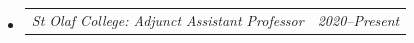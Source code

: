 \documentclass[12pt,letterpaper]{article}
\makeatletter
\newcommand{\headerpair}[2]{
    \begin{tabular*}{\linewidth}{l@{ \extracolsep{\fill} }r} {\large\emph{#1}} & {\large\emph{#2}}
    \end{tabular*}
}
\newcommand{\headerrow}[3]{\headerpair{#2: #1}{#3}}
\newcommand{\CPP}{C\nolinebreak[4]\hspace{-.05em}\raisebox{.22ex}{\footnotesize\bf ++}\xspace}
\makeatother
\begin{document}
\begin{itemize}[leftmargin=\parindent]
\begin{itemize}[leftmargin=\parindent]



        \end{itemize}


    \item[]
        \headerrow
            {Adjunct Assistant Professor}
            {St Olaf College}
            {2020--Present}
        \begin{itemize}[leftmargin=\parindent]


\end{itemize}
\end{itemize}
\end{document}

